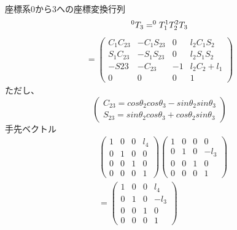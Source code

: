 \documentclass[a4j]{jarticle}			%
\begin{document}
\begin{multicols}{2} %

座標系0から3への座標変換行列 
\small
$$
	^{0}T_{3}=^{0}T_{1} ^{1}T_{2} ^{2}T_{3} \\
$$
\begin{equation*}
	\begin{array}{cc}
		=
		\left( 
			\begin{array}{cccc}
				C_1C_{23} & -C_1S_{23} & 0 & l_2C_1S_2 \\
				S_1C_{23} & -S_1S_{23} & 0 & l_2S_1S_2 \\
				-S{23} & -C_{23} & -1 & l_2C_2 + l_1 \\
				0 & 0 & 0 & 1 
			\end{array}
		\right)
	\end{array}
\end{equation*}
\normalsize
ただし、
\begin{equation*}
	\left(
	\begin{split}
		C_{23} = cos\theta_2cos\theta_3-sin\theta_2sin\theta_3\\
		S_{23} = sin\theta_2cos\theta_3+cos\theta_2sin\theta_3	
	\end{split}
	\right)
\end{equation*}
\normalsize
手先ベクトル
\tiny
\begin{equation*}
	\begin{array}{cccc}
		&\left( 
			\begin{array}{cccc}
				1 & 0 & 0 & l_4\\
				0 & 1 & 0 & 0\\
				0 & 0 & 1 & 0\\
				0 & 0 & 0 & 1 
			\end{array}
		\right)
		\left( 
			\begin{array}{cccc}
				1 & 0 & 0 & 0\\
				0 & 1 & 0 & -l_3\\
				0 & 0 & 1 & 0\\
				0 & 0 & 0 & 1 
			\end{array}
			\right)\\
		&=
		\left( 
		\begin{array}{cccc}
			1 & 0 & 0 & l_4\\
			0 & 1 & 0 & -l_3\\
			0 & 0 & 1 & 0\\
			0 & 0 & 0 & 1 
		\end{array}
		\right)
	\end{array}
\end{equation*}

\end{multicols}
\end{document}
